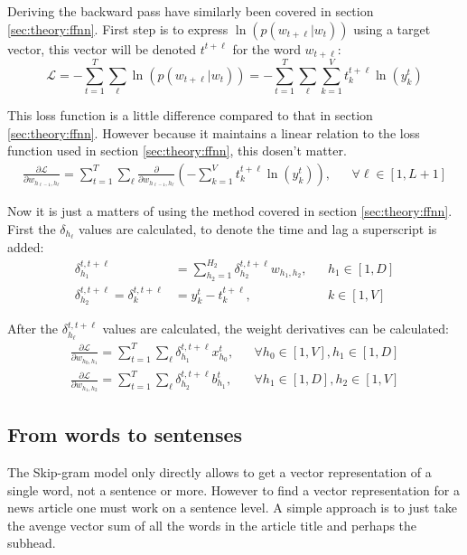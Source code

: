 Deriving the backward pass have similarly been covered in section \ref{sec:theory:ffnn}. First step is to express $\ln( p(w_{t + \ell} | w_t) )$ using a target vector, this vector will be denoted $t^{t+\ell}$ for the word $w_{t + \ell}$:
\begin{equation}
\mathcal{L} =  - \sum_{t = 1}^T \sum_{\ell} \ln( p(w_{t + \ell} | w_t)) =  - \sum_{t = 1}^T \sum_{\ell} \sum_{k=1}^V t_k^{t+\ell} \ln(y_k^t)
\end{equation}

This loss function is a little difference compared to that in section \ref{sec:theory:ffnn}. However because it maintains a linear relation to the loss function used in section \ref{sec:theory:ffnn}, this dosen't matter.
\begin{equation}
\begin{aligned}
\frac{\partial \mathcal{L}}{\partial w_{h_{\ell-1}, h_\ell}} = \sum_{t = 1}^T \sum_{\ell} \frac{\partial}{\partial w_{h_{\ell-1}, h_\ell}} \left(- \sum_{k=1}^V t_k^{t+\ell} \ln(y_k^t)\right), && \forall \ell \in [1, L + 1]
\end{aligned}
\end{equation}

Now it is just a matters of using the method covered in section \ref{sec:theory:ffnn}. First the $\delta_{h_\ell}$ values are calculated, to denote the time and lag a superscript is added:
\begin{equation}
\begin{aligned}
\delta_{h_1}^{t, t + \ell} &= \sum_{h_2=1}^{H_2} \delta_{h_2}^{t, t + \ell} w_{h_1, h_2}, && h_1 \in [1, D] \\
\delta_{h_2}^{t, t + \ell} = \delta_{k}^{t, t + \ell} &= y_k^t - t_k^{t+\ell}, && k \in [1, V]
\end{aligned}
\end{equation}

After the $\delta_{h_\ell}^{t, t+\ell}$ values are calculated, the weight derivatives can be calculated:
\begin{equation}
\begin{aligned}
\frac{\partial \mathcal{L}}{\partial w_{h_{0}, h_1}}= \sum_{t = 1}^T \sum_{\ell} \delta_{h_1}^{t, t + \ell} x_{h_0}^t, && \forall h_0 \in [1, V], h_1 \in [1, D] \\
\frac{\partial \mathcal{L}}{\partial w_{h_{1}, h_2}}= \sum_{t = 1}^T \sum_{\ell} \delta_{h_2}^{t, t + \ell} b_{h_1}^t, && \forall h_1 \in [1, D], h_2 \in [1, V]
\end{aligned}
\end{equation}

\subsection{From words to sentenses}
The Skip-gram model only directly allows to get a vector representation of a single word, not a sentence or more. However to find a vector representation for a news article one must work on a sentence level. A simple approach is to just take the avenge vector sum of all the words in the article title and perhaps the subhead.
